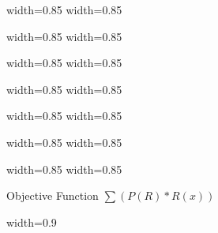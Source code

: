 \begin{frame}
      {width=0.85\textwidth} {}
      {width=0.85\textwidth} {}
\end{frame}
\begin{frame}
      {width=0.85\textwidth} {}
      {width=0.85\textwidth} {}
\end{frame}
\begin{frame}
      {width=0.85\textwidth} {}
      {width=0.85\textwidth} {}
\end{frame}
\begin{frame}
      {width=0.85\textwidth} {}
      {width=0.85\textwidth} {}
\end{frame}
\begin{frame}
      {width=0.85\textwidth} {}
      {width=0.85\textwidth} {}
\end{frame}
\begin{frame}
      {width=0.85\textwidth} {}
      {width=0.85\textwidth} {}
\end{frame}
\begin{frame}
      {width=0.85\textwidth} {}
      {width=0.85\textwidth} {}
\end{frame}
\begin{frame} 
\begin{center}
 \Huge Objective Function  $\sum(P(R)*R(x))$
\end{center}

\end{frame}	
\begin{frame}
      {width=0.9\textwidth} {}
\end{frame}

